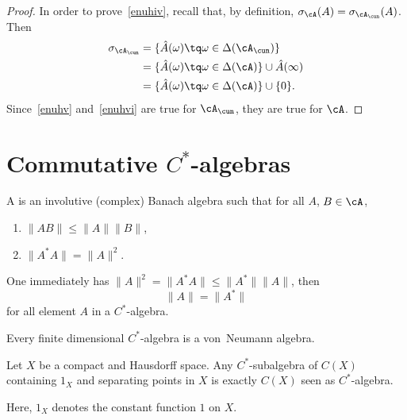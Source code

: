 \begin{proof}
	In order to prove~\ref{enuhiv}, recall that, by definition, $\sigma_{\cA}(A)=\sigma_{\cA_{\cun}}(A)$. Then
	\begin{subequations}
		\begin{align}
			\sigma_{\cA_{\cun}} & =\{\hat A(\omega)\tq\omega\in\Delta(\cA_{\cun})\}             \\
			                    & =\{\hat A(\omega)\tq \omega\in\Delta(\cA)\}\cup\hat A(\infty) \\
			                    & =\{\hat A(\omega)\tq \omega\in\Delta(\cA)\}\cup\{0\}.
		\end{align}
	\end{subequations}
	Since~\ref{enuhv} and~\ref{enuhvi} are true for $\cA_{\cun}$, they are true for $\cA$.

\end{proof}

\section{Commutative \texorpdfstring{$C^*$}{C}-algebras}

\begin{definition}
	A  is an involutive (complex) Banach algebra such that for all $A$, $B\in\cA$,
	\begin{enumerate}
		\item $\|AB\|\leq\|A\|\|B\|$,
		\item $\|A^*A\|=\|A\|^2$.
	\end{enumerate}
	One immediately has $\|A\|^2=\|A^*A\|\leq\|A^*\|\|A\|$, then
	\begin{equation}
		\|A\|=\|A^*\|
	\end{equation}
	for all element $A$ in a $C^*$-algebra.
\end{definition}

\begin{lemma}       \label{LemFiniCSestVNa}
	Every finite dimensional $C^*$-algebra is a von~Neumann algebra.
\end{lemma}

\begin{lemma}
	Let $X$ be a compact and Hausdorff space. Any $C^*$-subalgebra of $C(X)$ containing $1_X$ and separating points in $X$ is exactly $C(X)$ seen as $C^*$-algebra.
\end{lemma}\label{lem:Stone_W}
Here, $1_X$ denotes the constant function $1$ on $X$.

